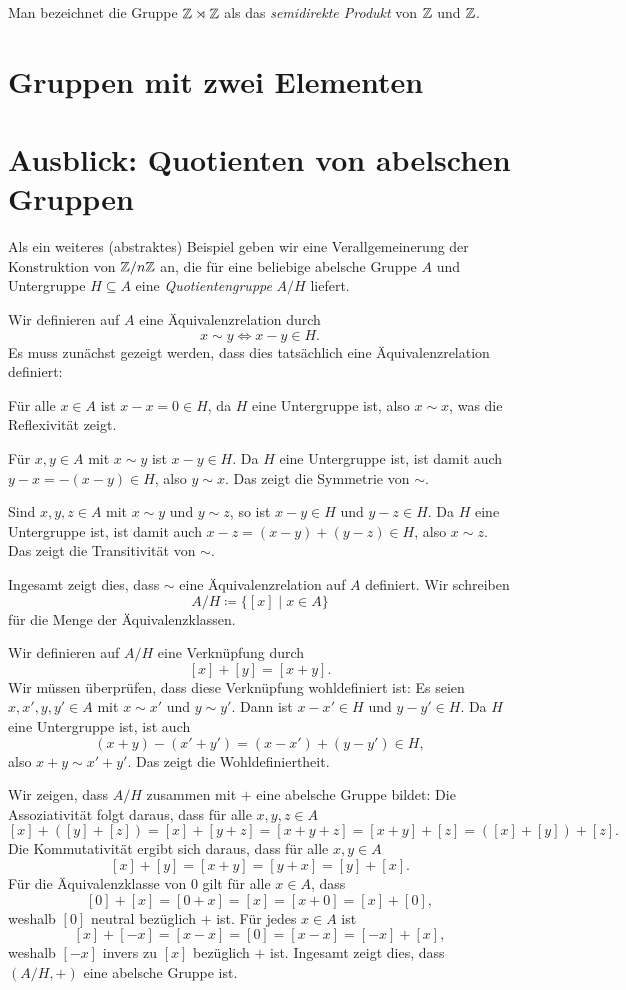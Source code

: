 Man bezeichnet die Gruppe $\mathbb{Z} \rtimes \mathbb{Z}$ als das \emph{semidirekte Produkt} von $\mathbb{Z}$ und $\mathbb{Z}$.




\section{Gruppen mit zwei Elementen}





\section{Ausblick: Quotienten von abelschen Gruppen}
Als ein weiteres (abstraktes) Beispiel geben wir eine Verallgemeinerung der Konstruktion von $\mathbb{Z}/n\mathbb{Z}$ an, die für eine beliebige abelsche Gruppe $A$ und Untergruppe $H \subseteq A$ eine \emph{Quotientengruppe} $A/H$ liefert.

Wir definieren auf $A$ eine Äquivalenzrelation durch
\[
 x \sim y \iff x-y \in H.
\]
Es muss zunächst gezeigt werden, dass dies tatsächlich eine Äquivalenzrelation definiert:

Für alle $x \in A$ ist $x-x = 0 \in H$, da $H$ eine Untergruppe ist, also $x \sim x$, was die Reflexivität zeigt.

Für $x,y \in A$ mit $x \sim y$ ist $x-y \in H$. Da $H$ eine Untergruppe ist, ist damit auch $y-x = -(x-y) \in H$, also $y \sim x$. Das zeigt die Symmetrie von $\sim$.

Sind $x,y,z \in A$ mit $x \sim y$ und $y \sim z$, so ist $x-y \in H$ und $y-z \in H$. Da $H$ eine Untergruppe ist, ist damit auch $x-z = (x-y)+(y-z) \in H$, also $x \sim z$. Das zeigt die Transitivität von $\sim$.

Ingesamt zeigt dies, dass $\sim$ eine Äquivalenzrelation auf $A$ definiert. Wir schreiben
\[
 A/H
 \coloneqq \{[x] \mid x \in A\}
\]
für die Menge der Äquivalenzklassen.

Wir definieren auf $A/H$ eine Verknüpfung durch
\[
 [x]+[y] = [x+y].
\]
Wir müssen überprüfen, dass diese Verknüpfung wohldefiniert ist: Es seien $x, x', y, y' \in A$ mit $x \sim x'$ und $y \sim y'$. Dann ist $x-x' \in H$ und $y-y' \in H$. Da $H$ eine Untergruppe ist, ist auch
\[
 (x+y)-(x'+y') = (x-x') + (y-y') \in H,
\]
also $x+y \sim x'+y'$. Das zeigt die Wohldefiniertheit.

Wir zeigen, dass $A/H$ zusammen mit $+$ eine abelsche Gruppe bildet: Die Assoziativität folgt daraus, dass für alle $x,y,z \in A$
\[
 [x] + ([y] + [z])
 = [x] + [y+z]
 = [x+y+z]
 = [x+y] + [z]
 = ([x] + [y]) + [z].
\]
Die Kommutativität ergibt sich daraus, dass für alle $x,y \in A$
\[
 [x] + [y] = [x+y] = [y+x] = [y] + [x].
\]
Für die Äquivalenzklasse von $0$ gilt für alle $x \in A$, dass
\[
 [0] + [x] = [0+x] = [x] = [x+0] = [x] + [0], 
\]
weshalb $[0]$ neutral bezüglich $+$ ist. Für jedes $x \in A$ ist
\[
 [x] + [-x] = [x-x] = [0] = [x-x] = [-x] + [x],
\]
weshalb $[-x]$ invers zu $[x]$ bezüglich $+$ ist. Ingesamt zeigt dies, dass $(A/H, +)$ eine abelsche Gruppe ist.


